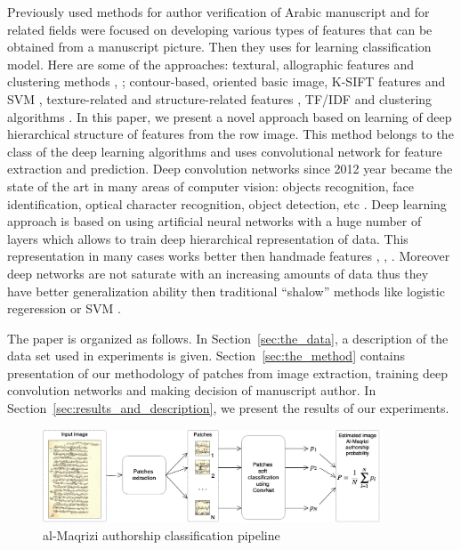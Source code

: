 \documentclass[conference,a4paper,twocolumn]{IEEEtran}
\begin{document}
Previously used methods for author verification of Arabic manuscript and for related fields were focused on developing various types of features that can be obtained from a manuscript picture. Then they uses for learning classification model. Here are some of the approaches: textural, allographic features and clustering methods \cite{MBulacu}, \cite{MBulacu1}; contour-based, oriented basic image, K-SIFT features and SVM \cite{DFecker}, texture-related and structure-related features \cite{Salvador}, TF/IDF and clustering algorithms \cite{Dunn}. In this paper, we present a novel approach based on learning of deep hierarchical structure of features from the row image. This method belongs to the class of the deep learning algorithms \cite{DL} and uses convolutional network \cite{CNN} for feature extraction and prediction. Deep convolution networks since 2012 year \cite{Alexnet} became the state of the art in many areas of computer vision: objects recognition, face identification, optical character recognition, object detection, etc \cite{DL}. Deep learning approach is based on using artificial neural networks with a huge number of layers which allows to train deep hierarchical representation of data. This representation in many cases works better then handmade features \cite{DL}, \cite{Alexnet}, \cite{Googlenet}. Moreover deep networks are not saturate with an increasing amounts of data thus they have better generalization ability then traditional ``shalow'' methods like logistic regeression or SVM \cite{DL}.   

The paper is organized as follows. In Section~\ref{sec:the_data}, a description of the data set used in experiments is given. Section~\ref{sec:the_method} contains presentation of our methodology of patches from image extraction, training deep convolution networks and making decision of manuscript author. In Section~\ref{sec:results_and_description}, we present the results of our experiments.
	

\begin{figure}[!t]
	\center
  \includegraphics[width=0.9\textwidth]{figures/Al-Maqrizi_classification_pipeline.png}
  \caption{al-Maqrizi authorship classification pipeline}
  \label{fig:pipeline}
\end{figure}	
	
\end{document}

